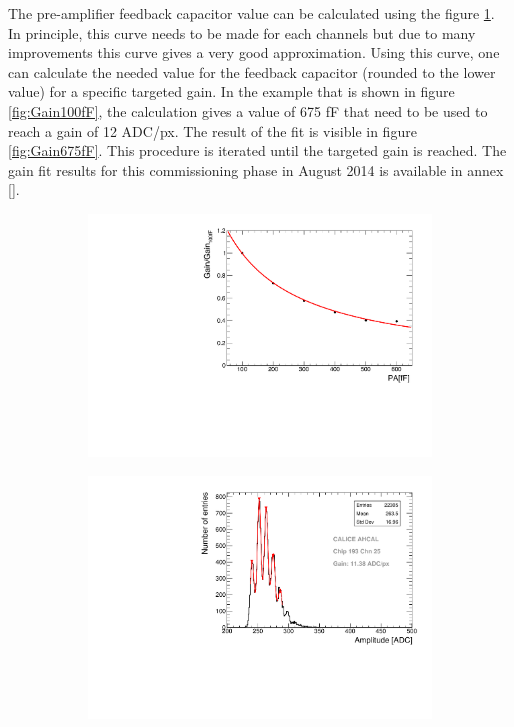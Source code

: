 The pre-amplifier feedback capacitor value can be calculated using the figure \ref{fig:PA_curve}. In principle, this curve needs to be made for each channels but due to many improvements this curve gives a very good approximation. Using this curve, one can calculate the needed value for the feedback capacitor (rounded to the lower value) for a specific targeted gain. In the example that is shown in figure \ref{fig:Gain100fF}, the calculation gives a value of 675 fF that need to be used to reach a gain of 12 ADC/px. The result of the fit is visible in figure \ref{fig:Gain675fF}. This procedure is iterated until the targeted gain is reached. The gain fit results for this commissioning phase in August 2014 is available in annex \ref{}.

\begin{figure}[htbp!]
  \centering
  \begin{subfigure}[t]{0.49\textwidth}
    \includegraphics[width=1.\linewidth]{../Thesis_Plots/Commissioning/Plots/GainvsPA.pdf}
    \caption{} \label{fig:PA_curve}
  \end{subfigure}
  \hfill
  \begin{subfigure}[t]{0.49\textwidth}
    \includegraphics[width=1.\linewidth]{../Thesis_Plots/Commissioning/Plots/Gain675fF_MainzHBU4.pdf}

\end{subfigure}
\end{figure}
